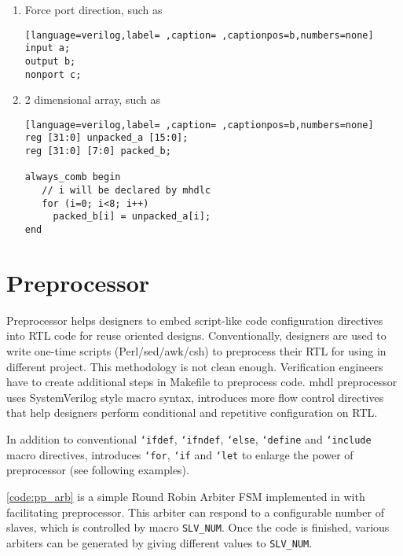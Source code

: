 \documentclass[10pt,oneside]{book}
\begin{document}
\begin{enumerate}
\item Force port direction, such as
\begin{lstlisting}[language=verilog,label= ,caption= ,captionpos=b,numbers=none]
input a;
output b;
nonport c;
\end{lstlisting}

\item 2 dimensional array, such as
\begin{lstlisting}[language=verilog,label= ,caption= ,captionpos=b,numbers=none]
reg [31:0] unpacked_a [15:0];
reg [31:0] [7:0] packed_b;

always_comb begin
   // i will be declared by mhdlc
   for (i=0; i<8; i++)
     packed_b[i] = unpacked_a[i];
end
\end{lstlisting}
\end{enumerate}

\chapter{Preprocessor}
\label{sec:orga49f1d8}
Preprocessor helps designers to embed script-like code configuration
directives into RTL code for reuse oriented designs.  Conventionally,
designers are used to write one-time scripts (Perl/sed/awk/csh) to
preprocess their RTL for using in different project.  This methodology
is not clean enough.  Verification engineers have to create additional
steps in Makefile to preprocess code.  mhdl preprocessor uses
SystemVerilog style macro syntax, introduces more flow control
directives that help designers perform conditional and repetitive
configuration on RTL.

In addition to conventional \texttt{`ifdef}, \texttt{`ifndef}, \texttt{`else}, \texttt{`define}
and \texttt{`include} macro directives, introduces \texttt{`for}, \texttt{`if} and \texttt{`let}
to enlarge the power of preprocessor (see following examples).

\autoref{code:pp_arb} is a simple Round Robin Arbiter FSM implemented in
with facilitating preprocessor.  This arbiter can respond to a
configurable number of slaves, which is controlled by macro
\texttt{SLV\_NUM}.  Once the code is finished, various arbiters can be
generated by giving different values to \texttt{SLV\_NUM}.
\end{document}

